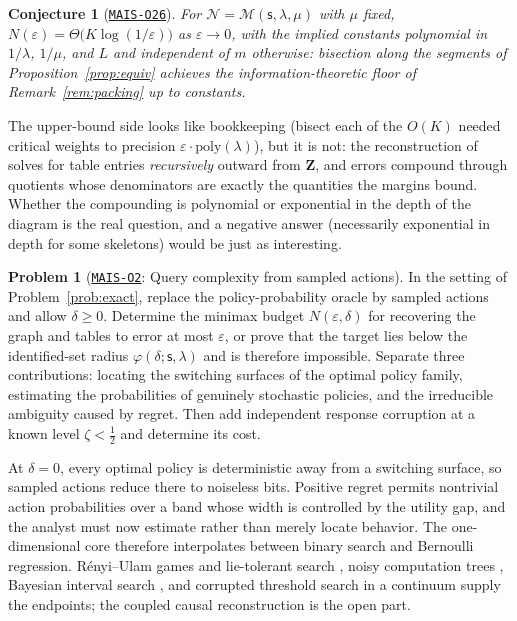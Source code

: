 \documentclass[11pt]{amsart}
\newcommand{\Oid}[1]{\href{https://github.com/lionellevine/MAIS/blob/main/open-problems/MAIS-O#1.md}{\texttt{MAIS-O#1}}}
\theoremstyle{plain}
\newtheorem{conjecture}[theorem]{Conjecture}
\theoremstyle{definition}
\newtheorem{problem}[theorem]{Problem}
\newcommand{\bZ}{\mathbf{Z}}
\newcommand{\MM}{\mathcal{M}}
\newcommand{\sk}{\mathsf{s}}
\begin{document}
\begin{conjecture}[\Oid{26}]\label{conj:exact}
For $\mathcal{N}=\MM(\sk,\lambda,\mu)$ with $\mu$ fixed, $N(\varepsilon)=\Theta\bigl(K\log(1/\varepsilon)\bigr)$ as $\varepsilon\to0$, with the implied constants polynomial in $1/\lambda$, $1/\mu$, and $L$ and independent of $m$ otherwise: bisection along the segments of Proposition~\ref{prop:equiv} achieves the information-theoretic floor of Remark~\ref{rem:packing} up to constants.
\end{conjecture}

The upper-bound side looks like bookkeeping (bisect each of the $O(K)$ needed critical weights to precision $\varepsilon\cdot\mathrm{poly}(\lambda)$), but it is not: the reconstruction of \cite{richens2024} solves for table entries \emph{recursively} outward from $\bZ$, and errors compound through quotients whose denominators are exactly the quantities the margins bound. Whether the compounding is polynomial or exponential in the depth of the diagram is the real question, and a negative answer (necessarily exponential in depth for some skeletons) would be just as interesting.

\begin{problem}[\Oid{2}: Query complexity from sampled actions]\label{prob:noisy}
In the setting of Problem~\ref{prob:exact}, replace the policy-probability oracle by sampled actions and allow $\delta\ge0$. Determine the minimax budget $N(\varepsilon,\delta)$ for recovering the graph and tables to error at most $\varepsilon$, or prove that the target lies below the identified-set radius $\varphi(\delta;\sk,\lambda)$ and is therefore impossible. Separate three contributions: locating the switching surfaces of the optimal policy family, estimating the probabilities of genuinely stochastic policies, and the irreducible ambiguity caused by regret. Then add independent response corruption at a known level $\zeta<\tfrac12$ and determine its cost.
\end{problem}

At $\delta=0$, every optimal policy is deterministic away from a switching surface, so sampled actions reduce there to noiseless bits. Positive regret permits nontrivial action probabilities over a band whose width is controlled by the utility gap, and the analyst must now estimate rather than merely locate behavior. The one-dimensional core therefore interpolates between binary search and Bernoulli regression. R\'enyi--Ulam games and lie-tolerant search \cite{rivest1980}, noisy computation trees \cite{feige1994}, Bayesian interval search \cite{benor2008,karp2007}, and corrupted threshold search in a continuum \cite{krishnamurthy2021} supply the endpoints; the coupled causal reconstruction is the open part.
\end{document}
